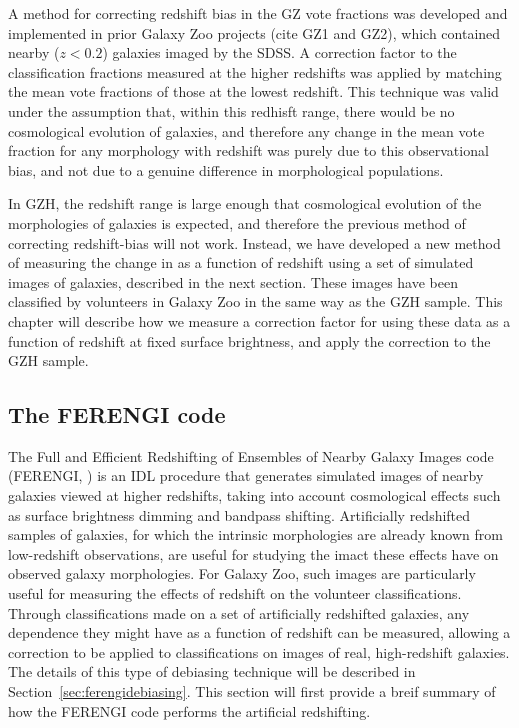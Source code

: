A method for correcting redshift bias in the GZ vote fractions was developed and implemented in prior Galaxy Zoo projects (cite GZ1 and GZ2), which contained nearby ($z<0.2$) galaxies imaged by the SDSS. A correction factor to the classification fractions measured at the higher redshifts was applied by matching the mean vote fractions of those at the lowest redshift. This technique was valid under the assumption that, within this redhisft range, there would be no cosmological evolution of galaxies, and therefore any change in the mean vote fraction for any morphology with redshift was purely due to this observational bias, and not due to a genuine difference in morphological populations. 

In GZH, the redshift range is large enough that cosmological evolution of the morphologies of galaxies is expected, and therefore the previous method of correcting redshift-bias will not work. Instead, we have developed a new method of measuring the change in \ffeatures{} as a function of redshift using a set of simulated \ferengi{} images of galaxies, described in the next section. These images have been classified by volunteers in Galaxy Zoo in the same way as the GZH sample. This chapter will describe how we measure a correction factor for \ffeatures{} using these data as a function of redshift at fixed surface brightness, and apply the correction to the GZH sample. 

\subsection{The FERENGI code}
\label{sec:ferengicode}
The Full and Efficient Redshifting of Ensembles of Nearby Galaxy Images code (FERENGI, \citet{Barden2008}) is an IDL procedure that generates simulated images of nearby galaxies viewed at higher redshifts, taking into account cosmological effects such as surface brightness dimming and bandpass shifting. Artificially redshifted samples of galaxies, for which the intrinsic morphologies are already known from low-redshift observations, are useful for studying the imact these effects have on observed galaxy morphologies. For Galaxy Zoo, such images are particularly useful for measuring the effects of redshift on the volunteer classifications. Through classifications made on a set of artificially redshifted galaxies, any dependence they might have as a function of redshift can be measured, allowing a correction to be applied to classifications on images of real, high-redshift galaxies. The details of this type of debiasing technique will be described in Section~\ref{sec:ferengidebiasing}. This section will first provide a breif summary of how the FERENGI code performs the artificial redshifting.

